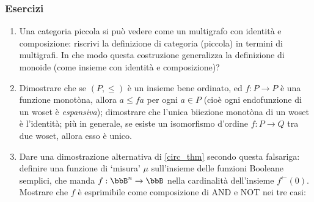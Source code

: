 \subsubsection*{Esercizi}
\begin{enumerate}
	\item Una categoria piccola si può vedere come un multigrafo con identità e composizione: riscrivi la definizione di categoria (piccola) in termini di multigrafi.  In che modo questa costruzione generalizza la definizione di monoide (come insieme con identità e composizione)?
	\item Dimostrare che  se \((P,\le)\) è un insieme bene ordinato, ed \(f : P\to P\) è una funzione monotòna, allora \(a\le fa\) per ogni \(a\in P\) (cioè ogni endofunzione di un woset è \emph{espansiva}); dimostrare che l'unica biiezione monotòna di un woset è l'identità; più in generale, se esiste un isomorfismo d'ordine \(f : P\to Q\) tra due woset, allora esso è unico.
  \item Dare una dimostrazione alternativa di \ref{circ_thm} secondo questa falsariga: definire una funzione di `misura' $\mu$ sull'insieme delle funzioni Booleane semplici, che manda $f : \bbB^n\to\bbB$ nella cardinalità dell'insieme $f^\leftarrow(0)$. Mostrare che $f$ è esprimibile come composizione di AND e NOT nei tre casi:

\end{enumerate}
